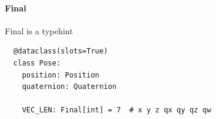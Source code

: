 \paragraph{Final}
  Final is a typehint
  \begin{verbatim}
  @dataclass(slots=True)
  class Pose:
    position: Position
    quaternion: Quaternion
    
    VEC_LEN: Final[int] = 7  # x y z qx qy qz qw
    \end{verbatim}